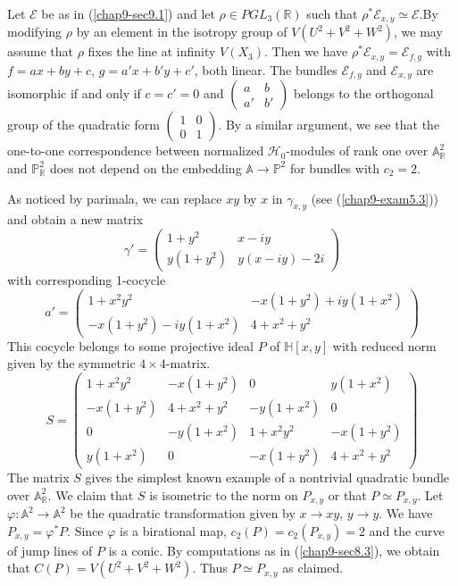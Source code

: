 Let $\mathscr{E}$ be as in (\ref{chap9-sec9.1}) and let $\rho\in
PGL_{3}(\mathbb{R})$ such that
$\rho^{*}\mathscr{E}_{x,y}\simeq \mathscr{E}$.\pageoriginale By
modifying $\rho$ by an element in the isotropy group of
$V(U^{2}+V^{2}+W^{2})$, we may assume that $\rho$ fixes the line at
infinity $V(X_{3})$. Then we have
$\rho^{*}\mathscr{E}_{x,y}=\mathscr{E}_{f,g}$ with $f=ax+by+c$,
$g=a'x+b'y+c'$, both linear. The bundles $\mathscr{E}_{f,g}$ and
$\mathscr{E}_{x,y}$ are isomorphic if and only if $c=c'=0$ and
$\left(\begin{smallmatrix} a & b\\ a' & b'\end{smallmatrix}\right)$
belongs to the orthogonal group of the quadratic form 
$\left(\begin{smallmatrix} 1 & 0\\ 0 & 1\end{smallmatrix}\right)$. By
a similar argument, we see that the one-to-one correspondence between
normalized $\mathscr{H}_{0}$-modules of rank one over
$\mathbb{A}^{2}_{\mathbb{R}}$ and $\mathbb{P}^{2}_{\mathbb{R}}$ does
not depend on the embedding $\mathbb{A}\to \mathbb{P}^{2}$ for bundles
with $c_{2}=2$.

\setcounter{subprop}{2}
\begin{subexam}\label{chap9-exam9.3}
As noticed by parimala, we can replace $xy$ by $x$ in $\gamma_{x,y}$
(see (\ref{chap9-exam5.3})) and obtain a new matrix
$$
\gamma'=
\begin{pmatrix}
1+y^{2} & x-iy\\
y(1+y^{2}) & y(x-iy)-2i
\end{pmatrix}
$$
with corresponding 1-cocycle
$$
a'=
\begin{pmatrix}
1+x^{2}y^{2} & -x(1+y^{2})+iy(1+x^{2})\\
-x(1+y^{2})-iy(1+x^{2}) & 4+x^{2}+y^{2}
\end{pmatrix}
$$
This cocycle belongs to some projective ideal $P$ of $\mathbb{H}[x,y]$
with reduced norm given by the symmetric $4\times 4$-matrix.
$$
S=
\begin{pmatrix}
1+x^{2}y^{2} & -x(1+y^{2}) & 0 & y(1+x^{2})\\
-x(1+y^{2}) & 4+x^{2}+y^{2} & -y(1+x^{2}) & 0\\
0 & -y(1+x^{2}) & 1+x^{2}y^{2} & -x(1+y^{2})\\
y(1+x^{2}) & 0 & -x(1+y^{2}) & 4+x^{2}+y^{2}
\end{pmatrix}
$$\pageoriginale
The matrix $S$ gives the simplest known example of a nontrivial
quadratic bundle over $\mathbb{A}^{2}_{\mathbb{R}}$. We claim that $S$
is isometric to the norm on $P_{x,y}$ or that $P\simeq P_{x,y}$. Let
$\varphi:\mathbb{A}^{2}\to \mathbb{A}^{2}$ be the quadratic
transformation given by $x\to xy$, $y\to y$. We have
$P_{x,y}=\varphi^{*}P$. Since $\varphi$ is a birational map,
$c_{2}(P)=c_{2}(P_{x,y})=2$ and the curve of jump lines of $P$ is a
conic. By computations as in (\ref{chap9-sec8.3}), we obtain that
$C(P)=V(U^{2}+V^{2}+W^{2})$. Thus $P\simeq P_{x,y}$ as claimed.
\end{subexam}

